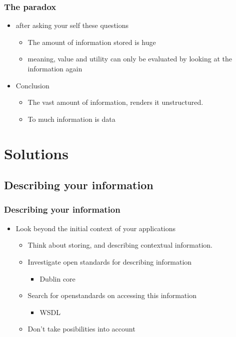 \documentclass{beamer}
\begin{document}
\begin{frame}
\frametitle{The paradox}

\begin{itemize}
  \item after asking your self these questions
  \begin{itemize}
    \item The amount of information stored is huge
    \item meaning, value and utility can only be evaluated by looking at the
    information again
  \end{itemize}
  \item Conclusion
  \begin{itemize}
    \item The vast amount of information, renders it unstructured.
    \item To much information is data
  \end{itemize}
  
\end{itemize}

\end{frame}

\section{Solutions}

\subsection[Describing your information]{Describing your information}

\begin{frame}
\frametitle{Describing your information}

\begin{itemize}
  \item Look beyond the initial context of your applications 
  \begin{itemize}
    \item Think about storing, and describing contextual information.
    \item Investigate open standards for describing information
    \begin{itemize}
      \item Dublin core     
    \end{itemize} 
    \item Search for openstandards on accessing this information
    \begin{itemize}
      \item WSDL
    \end{itemize}
    \item Don't take posibilities into account  
  \end{itemize}
\end{itemize}

\end{frame}
\end{document}

